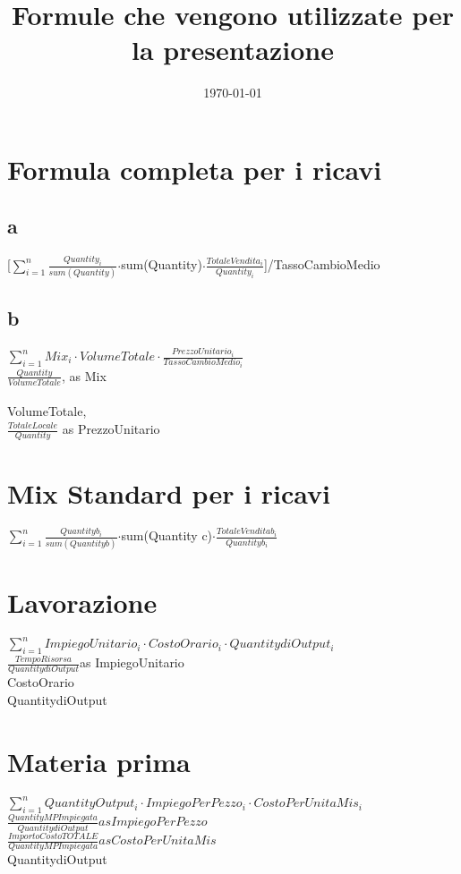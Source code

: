 \documentclass[20pt]{extarticle}
\title{Formule che vengono utilizzate per la presentazione}
\date{\today}
\begin{document}
\maketitle
\section{Formula completa per i ricavi}
\subsection{a}
[$\sum_{i=1} ^{n}$$\frac{Quantity_{i}}{sum(Quantity)}$$\cdot$sum(Quantity)$\cdot$$\frac{Totale Vendita _{i}}{Quantity _{i}}$]/TassoCambioMedio
\subsection{b}
$\sum_{i=1} ^{n} Mix_{i}\cdot VolumeTotale \cdot $$\frac{PrezzoUnitario_{i}}{TassoCambioMedio_{i}}$
\\$\frac{Quantity}{VolumeTotale}$, as Mix\\
\bigskip
\\VolumeTotale, 
\bigskip
\\$\frac{TotaleLocale}{Quantity}$ as PrezzoUnitario

\section{Mix Standard per i ricavi}
$\sum_{i=1} ^{n}$$\frac{Quantityb_{i}}{sum(Quantity b)}$$\cdot$sum(Quantity c)$\cdot$$\frac{Totale Vendita b_{i}}{Quantity b_{i}}$

\section{Lavorazione}
$\sum_{i=1} ^{n} ImpiegoUnitario_i \cdot CostoOrario_i \cdot QuantitydiOutput_i$
\bigskip
\\$\frac{TempoRisorsa}{QuantitydiOutput}$as ImpiegoUnitario
\bigskip
\bigskip
\\CostoOrario
\bigskip
\bigskip
\\QuantitydiOutput

\section{Materia prima}
$\sum_{i=1} ^{n}QuantityOutput_i \cdot ImpiegoPerPezzo_i\cdot CostoPerUnitaMis_i$
\bigskip
\\$\frac{QuantityMPImpiegata}{QuantitydiOutput} as ImpiegoPerPezzo$
\bigskip
\bigskip
\\$\frac {ImportoCostoTOTALE}{QuantityMPImpiegata} as CostoPerUnitaMis$
\bigskip
\bigskip
\\QuantitydiOutput
\end{document}
